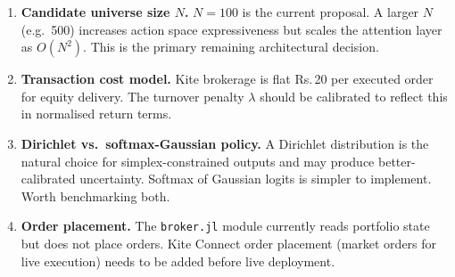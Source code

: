 \documentclass[11pt, a4paper]{article}
\begin{document}
\begin{enumerate}
    \item \textbf{Candidate universe size $N$.}
          $N = 100$ is the current proposal. A larger $N$ (e.g.\ 500) increases
          action space expressiveness but scales the attention layer as
          $O(N^2)$. This is the primary remaining architectural decision.

    \item \textbf{Transaction cost model.}
          Kite brokerage is flat Rs.\,20 per executed order for equity
          delivery. The turnover penalty $\lambda$ should be calibrated to
          reflect this in normalised return terms.

    \item \textbf{Dirichlet vs.\ softmax-Gaussian policy.}
          A Dirichlet distribution is the natural choice for simplex-constrained
          outputs and may produce better-calibrated uncertainty. Softmax of
          Gaussian logits is simpler to implement. Worth benchmarking both.

    \item \textbf{Order placement.}
          The \texttt{broker.jl} module currently reads portfolio state but
          does not place orders. Kite Connect order placement (market orders
          for live execution) needs to be added before live deployment.
\end{enumerate}
\end{document}
